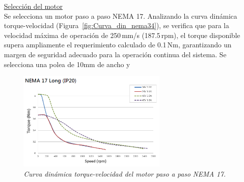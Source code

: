 \underline{Selección del motor} \\
Se selecciona un motor paso a paso NEMA 17. Analizando la curva dinámica torque-velocidad (Figura~\ref{fig:Curva_din_nema34}), se verifica que para la velocidad máxima de operación de 250\,mm/s (187.5\,rpm), el torque disponible supera ampliamente el requerimiento calculado de 0.1\,Nm, garantizando un margen de seguridad adecuado para la operación continua del sistema.
Se selecciona una polea de 10mm de ancho y 
\begin{figure}[H]
    \centering
    \includegraphics[width=0.65\textwidth]{img/Nema17.png}
    \caption{\textit{Curva dinámica torque-velocidad del motor paso a paso NEMA 17.}}
    \label{fig:Curva_din_nema17}
\end{figure}